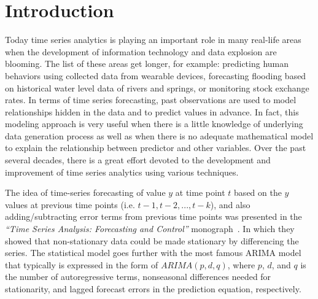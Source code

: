 \documentclass[review,3p,authoryear]{elsarticle}
\begin{document}
\section{Introduction}
\label{intro}
Today time series analytics is playing an important role in many real-life areas when the development of information technology and data explosion are blooming. The list of these areas get longer, for example: predicting human behaviors using collected data from wearable devices, forecasting flooding based on historical water level data of rivers and springs, or monitoring stock exchange rates. In terms of time series forecasting, past observations are used to model relationships hidden in the data and to predict values in advance. In fact, this modeling approach is very useful when there is a little knowledge of underlying data generation process as well as when there is no adequate mathematical model to explain the relationship between predictor and other variables. Over the past several decades, there is a great effort devoted to the development and improvement of time series analytics using various techniques.

%



The idea of time-series forecasting of value $y$ at time point $t$ based on the $y$ values at previous time points (i.e. $t-1, t-2, ..., t-k$), and also adding/subtracting error terms from previous time points was presented in the \textit{``Time Series Analysis: Forecasting and Control''} monograph~\citep{box2015time}. In which they showed that non-stationary data could be made stationary by differencing the series. The statistical model goes further with the most famous ARIMA model~\citep{arima} that typically is expressed in the form of $ARIMA(p, d, q)$, where
	$p$, $d$, and $q$ is the number of autoregressive terms, nonseasonal differences needed for stationarity, and lagged forecast errors in the prediction equation, respectively.
\end{document}
